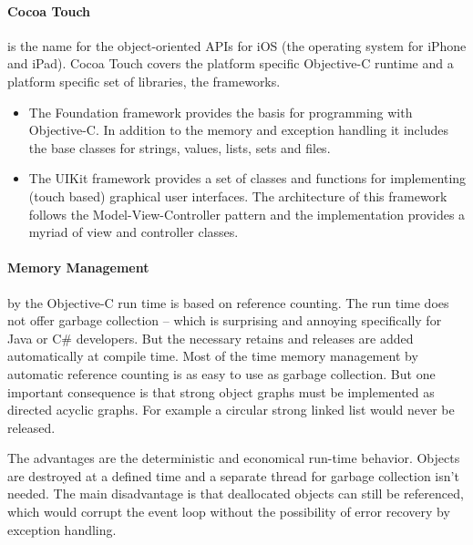 \paragraph{Cocoa Touch}
\label{sec:Cocoa}
is the name for the object-oriented APIs for iOS (the operating system for iPhone and iPad). 
Cocoa Touch covers the platform specific Objective-C runtime and a platform specific set of libraries, the frameworks.

\begin{itemize}
\item\label{secitem:CocoaFoundation}
The Foundation framework provides the basis for programming with Objective-C. 
In addition to the memory and exception handling it includes the base classes for strings, values, lists, sets and files.
\item\label{secitem:CocoaUIKit} The UIKit framework provides a set of classes and functions for implementing (touch based) graphical user interfaces. 
The architecture of this framework follows the Model-View-Controller pattern 
and the implementation provides a myriad of view and controller classes.
\end{itemize}

\paragraph{Memory Management} 
\label{sec:MemoryManagement}
by the Objective-C run time is based on reference counting. 
The run time does not offer  garbage collection – which is surprising and annoying specifically for Java or C\# developers. 
But the necessary retains and releases are added automatically at compile time.
Most of the time memory management by automatic reference counting is as easy to use as garbage collection.
But one important consequence is that strong object graphs must be implemented as directed acyclic graphs. 
For example a circular strong linked list would never be released. 

The advantages are the deterministic and economical run-time behavior.
Objects are destroyed at a defined time and a separate thread for garbage collection isn't needed. 
The main disadvantage is that deallocated objects can still be referenced, 
which would corrupt the event loop
without the possibility of error recovery by exception handling.




